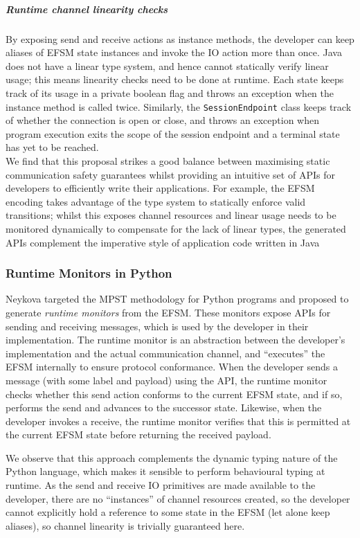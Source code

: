 \subparagraph{Runtime channel linearity checks}
By exposing send and receive actions as instance
methods, the developer can keep aliases of EFSM state instances
and invoke the IO action more than once. Java does not
have a linear type system, and hence cannot statically
verify linear usage; this means linearity checks need to be
done at runtime.
Each state keeps track of its usage in a private boolean flag 
and throws an exception when the instance method is called twice.
Similarly, the \texttt{SessionEndpoint} class keeps track of 
whether the connection is open or close,
and throws an exception when program execution exits the 
scope of the session endpoint and a terminal state 
has yet to be reached.\\

We find that this proposal strikes a good balance 
between maximising static communication safety guarantees 
whilst providing an intuitive set of APIs for developers 
to efficiently write their applications. 
For example, the EFSM encoding takes advantage of the type system 
to statically enforce valid transitions; whilst this
exposes channel resources and linear usage needs to be
monitored dynamically to compensate for the lack of linear types,
the generated APIs complement the 
imperative style of application code written in Java


\subsubsection{Runtime Monitors in Python \cite{Python2017} }
Neykova targeted the MPST methodology 
for Python programs
and proposed to generate \textit{runtime monitors} 
from the EFSM.
These monitors expose APIs for sending and receiving messages,
which is used by the developer in their implementation. 
The runtime monitor is an abstraction between the 
developer's implementation and the actual communication channel, 
and ``executes'' the EFSM internally to ensure protocol conformance. 
When the developer sends a message (with some label and payload) 
using the API, the runtime monitor checks 
whether this send action conforms to the current EFSM state, 
and if so, 
performs the send and advances to the successor state. 
Likewise, when the developer invokes a receive, 
the runtime monitor verifies that this is permitted 
at the current EFSM state before returning the received payload.

We observe that this approach complements the 
dynamic typing nature of the Python language, 
which makes it sensible to perform behavioural typing at runtime.
As the send and receive IO primitives are
made available to the developer,
there are no ``instances'' of channel resources created,
so the developer cannot explicitly hold a reference to
some state in the EFSM (let alone keep aliases),
so channel linearity is trivially guaranteed here.

